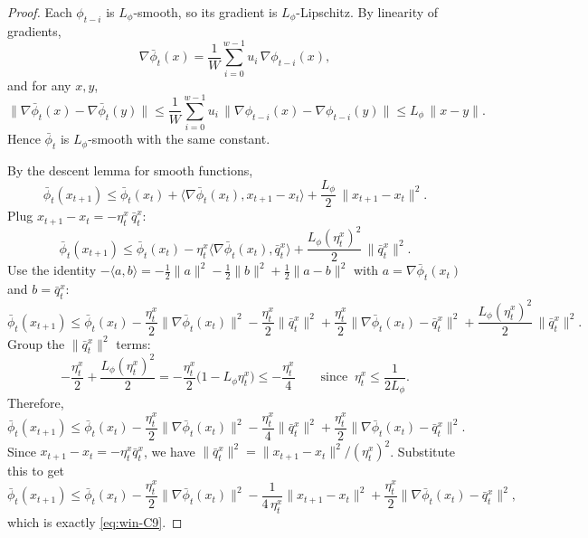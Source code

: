 \documentclass{uai2026} %
\begin{document}
\begin{proof}
Each $\phi_{t-i}$ is $L_\phi$-smooth, so its gradient is $L_\phi$-Lipschitz. By linearity of gradients,
\[
\nabla\bar\phi_t(x)=\frac{1}{W}\sum_{i=0}^{w-1}u_i\,\nabla\phi_{t-i}(x),
\]
and for any $x,y$,
\[
\|\nabla\bar\phi_t(x)-\nabla\bar\phi_t(y)\|
\le \frac{1}{W}\sum_{i=0}^{w-1}u_i\,\|\nabla\phi_{t-i}(x)-\nabla\phi_{t-i}(y)\|
\le L_\phi\,\|x-y\|.
\]
Hence $\bar\phi_t$ is $L_\phi$-smooth with the same constant.

By the descent lemma for smooth functions,
\[
\bar\phi_t(x_{t+1})
\le \bar\phi_t(x_t)+\big\langle\nabla\bar\phi_t(x_t),x_{t+1}-x_t\big\rangle
+\frac{L_\phi}{2}\,\|x_{t+1}-x_t\|^2.
\]
Plug $x_{t+1}-x_t=-\eta^x_t\,\bar q^x_t$:
\[
\bar\phi_t(x_{t+1})
\le \bar\phi_t(x_t)-\eta^x_t\langle\nabla\bar\phi_t(x_t),\bar q^x_t\rangle
+\frac{L_\phi(\eta^x_t)^2}{2}\,\|\bar q^x_t\|^2.
\]
Use the identity
\(
-\langle a,b\rangle = -\tfrac12\|a\|^2 -\tfrac12\|b\|^2 + \tfrac12\|a-b\|^2
\)
with $a=\nabla\bar\phi_t(x_t)$ and $b=\bar q^x_t$:
\[
\bar\phi_t(x_{t+1})
\le \bar\phi_t(x_t) - \frac{\eta^x_t}{2}\|\nabla\bar\phi_t(x_t)\|^2
- \frac{\eta^x_t}{2}\|\bar q^x_t\|^2
+ \frac{\eta^x_t}{2}\|\nabla\bar\phi_t(x_t)-\bar q^x_t\|^2
+ \frac{L_\phi(\eta^x_t)^2}{2}\,\|\bar q^x_t\|^2.
\]
Group the $\|\bar q^x_t\|^2$ terms:
\[
-\frac{\eta^x_t}{2} + \frac{L_\phi(\eta^x_t)^2}{2}
= -\frac{\eta^x_t}{2}\big(1-L_\phi\eta^x_t\big)
\le -\frac{\eta^x_t}{4}\qquad\text{since }\ \eta^x_t\le \frac{1}{2L_\phi}.
\]
Therefore,
\[
\bar\phi_t(x_{t+1})
\le \bar\phi_t(x_t) - \frac{\eta^x_t}{2}\|\nabla\bar\phi_t(x_t)\|^2
- \frac{\eta^x_t}{4}\|\bar q^x_t\|^2
+ \frac{\eta^x_t}{2}\|\nabla\bar\phi_t(x_t)-\bar q^x_t\|^2.
\]
Since $x_{t+1}-x_t=-\eta^x_t\bar q^x_t$, we have $\|\bar q^x_t\|^2=\|x_{t+1}-x_t\|^2/(\eta^x_t)^2$.
Substitute this to get
\[
\bar\phi_t(x_{t+1})
\le \bar\phi_t(x_t) - \frac{\eta^x_t}{2}\|\nabla\bar\phi_t(x_t)\|^2
- \frac{1}{4\,\eta^x_t}\|x_{t+1}-x_t\|^2
+ \frac{\eta^x_t}{2}\|\nabla\bar\phi_t(x_t)-\bar q^x_t\|^2,
\]
which is exactly \eqref{eq:win-C9}.
\end{proof}

\end{document}
